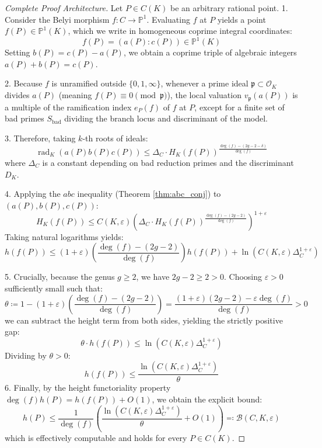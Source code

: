 \documentclass[11pt,a4paper]{article}
\theoremstyle{definition}
\begin{document}
\begin{proof}[Complete Proof Architecture]
Let $P \in C(K)$ be an arbitrary rational point.
1. Consider the Belyi morphism $f: C \to \mathbb{P}^1$. Evaluating $f$ at $P$ yields a point $f(P) \in \mathbb{P}^1(K)$, which we write in homogeneous coprime integral coordinates:
\[ f(P) = (a(P) : c(P)) \in \mathbb{P}^1(K) \]
Setting $b(P) = c(P) - a(P)$, we obtain a coprime triple of algebraic integers $a(P) + b(P) = c(P)$.

2. Because $f$ is unramified outside $\{0, 1, \infty\}$, whenever a prime ideal $\mathfrak{p} \subset \mathcal{O}_K$ divides $a(P)$ (meaning $f(P) \equiv 0 \pmod{\mathfrak{p}}$), the local valuation $v_{\mathfrak{p}}(a(P))$ is a multiple of the ramification index $e_P(f)$ of $f$ at $P$, except for a finite set of bad primes $S_{\text{bad}}$ dividing the branch locus and discriminant of the model.

3. Therefore, taking $k$-th roots of ideals:
\[ \operatorname{rad}_K(a(P) b(P) c(P)) \le \Delta_C \cdot H_K(f(P))^{\frac{\deg(f) - (2g - 2 - \delta)}{\deg(f)}} \]
where $\Delta_C$ is a constant depending on bad reduction primes and the discriminant $D_K$.

4. Applying the $abc$ inequality (Theorem \ref{thm:abc_conj}) to $(a(P), b(P), c(P))$:
\[ H_K(f(P)) \le C(K, \varepsilon) \left( \Delta_C \cdot H_K(f(P))^{\frac{\deg(f) - (2g - 2)}{\deg(f)}} \right)^{1 + \varepsilon} \]
Taking natural logarithms yields:
\[ h(f(P)) \le (1 + \varepsilon) \left( \frac{\deg(f) - (2g - 2)}{\deg(f)} \right) h(f(P)) + \ln(C(K, \varepsilon) \Delta_C^{1+\varepsilon}) \]

5. Crucially, because the genus $g \ge 2$, we have $2g - 2 \ge 2 > 0$.
Choosing $\varepsilon > 0$ sufficiently small such that:
\[ \theta \coloneqq 1 - (1 + \varepsilon) \left( \frac{\deg(f) - (2g - 2)}{\deg(f)} \right) = \frac{(1+\varepsilon)(2g-2) - \varepsilon \deg(f)}{\deg(f)} > 0 \]
we can subtract the height term from both sides, yielding the strictly positive gap:
\[ \theta \cdot h(f(P)) \le \ln(C(K, \varepsilon) \Delta_C^{1+\varepsilon}) \]
Dividing by $\theta > 0$:
\[ h(f(P)) \le \frac{\ln(C(K, \varepsilon) \Delta_C^{1+\varepsilon})}{\theta} \]
6. Finally, by the height functoriality property $\deg(f) h(P) = h(f(P)) + O(1)$, we obtain the explicit bound:
\[ h(P) \le \frac{1}{\deg(f)} \left( \frac{\ln(C(K, \varepsilon) \Delta_C^{1+\varepsilon})}{\theta} + O(1) \right) \eqqcolon \mathcal{B}(C, K, \varepsilon) \]
which is effectively computable and holds for every $P \in C(K)$.
\end{proof}
\end{document}
